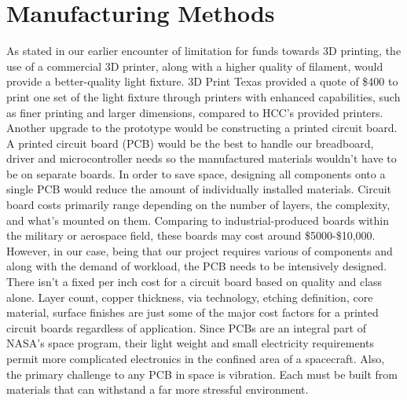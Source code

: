 \documentclass[12pt,a4paper]{report}
\begin{document}
\section{Manufacturing Methods}
As stated in our earlier encounter of limitation for funds towards 3D printing, the use of a commercial 3D printer, along with a higher quality of filament, would provide a better-quality light fixture. 3D Print Texas provided a quote of \$400 to print one set of the light fixture through printers with enhanced capabilities, such as finer printing and larger dimensions, compared to HCC’s provided printers.
Another upgrade to the prototype would be constructing a printed circuit board. A printed circuit board (PCB) would be the best to handle our breadboard, driver and microcontroller needs so the manufactured materials wouldn't have to be on separate boards. In order to save space, designing all components onto a single PCB would reduce the amount of individually installed materials. Circuit board costs primarily range depending on the number of layers, the complexity, and what's mounted on them. Comparing to industrial-produced boards within the military or aerospace field, these boards may cost around \$5000-\$10,000.
However, in our case, being that our project requires various of components and along with the demand of workload, the PCB needs to be intensively designed. There isn't a fixed per inch cost for a circuit board based on quality and class alone. Layer count, copper thickness, via technology, etching definition, core material, surface finishes are just some of the major cost factors for a printed circuit boards regardless of application. Since PCBs are an integral part of NASA's space program, their light weight and small electricity requirements permit more complicated electronics in the confined area of a spacecraft. Also, the primary challenge to any PCB in space is vibration. Each must be built from materials that can withstand a far more stressful environment. 
\end{document}
